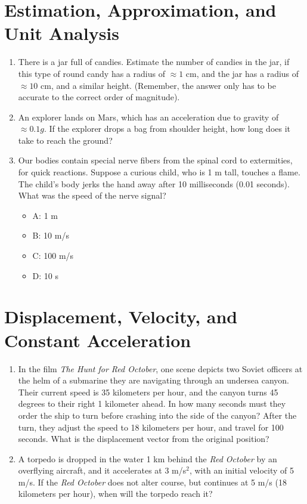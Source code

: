 \documentclass[10pt]{article}
\begin{document}
\maketitle

\section{Estimation, Approximation, and Unit Analysis}
\begin{enumerate}
\item There is a jar full of candies.  Estimate the number of candies in the jar, if this type of round candy has a radius of $\approx 1$ cm, and the jar has a radius of $\approx 10$ cm, and a similar height.  (Remember, the answer only has to be accurate to the correct order of magnitude). \vspace{1.5 cm}
\item An explorer lands on Mars, which has an acceleration due to gravity of $\approx 0.1 g$.  If the explorer drops a bag from shoulder height, how long does it take to reach the ground? \vspace{1.5 cm}
\item Our bodies contain special nerve fibers from the spinal cord to extermities, for quick reactions.  Suppose a curious child, who is 1 m tall, touches a flame.  The child's body jerks the hand away after 10 milliseconds (0.01 seconds).  What was the speed of the nerve signal? \\
\begin{itemize}
\item A: 1 m
\item B: 10 m/s
\item C: 100 m/s
\item D: 10 s
\end{itemize}
\end{enumerate}
\section{Displacement, Velocity, and Constant Acceleration}
\begin{enumerate}
\item In the film \textit{The Hunt for Red October}, one scene depicts two Soviet officers at the helm of a submarine they are navigating through an undersea canyon.  Their current speed is 35 kilometers per hour, and the canyon turns 45 degrees to their right 1 kilometer ahead.  In how many seconds must they order the ship to turn before crashing into the side of the canyon?  After the turn, they adjust the speed to 18 kilometers per hour, and travel for 100 seconds.  What is the displacement vector from the original position?\vspace{3cm}
\item A torpedo is dropped in the water 1 km behind the \textit{Red October} by an overflying aircraft, and it accelerates at 3 m/s$^2$, with an initial velocity of 5 m/s.  If the \textit{Red October} does not alter course, but continues at 5 m/s (18 kilometers per hour), when will the torpedo reach it?\vspace{3cm}
\end{enumerate}
\end{document}
